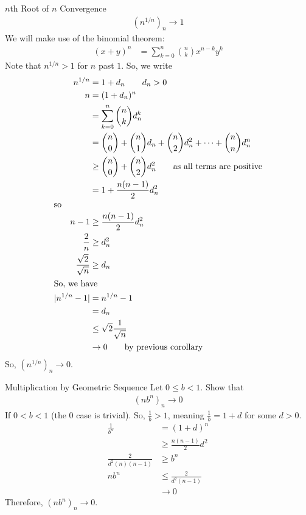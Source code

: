 \documentclass[10pt]{extarticle}
\begin{document}
    \begin{problem}{$n$th Root of $n$ Convergence}
      \begin{align*}
        \left(n^{1/n}\right)_n \rightarrow 1
      \end{align*}
      \tcblower
      We will make use of the binomial theorem:
      \begin{align*}
        (x+y)^n &= \sum_{k=0}^{n} {n\choose k}x^{n-k}y^{k}
      \end{align*}
      Note that $n^{1/n} > 1$ for $n$ past $1$. So, we write
      \begin{align*}
        n^{1/n} &= 1 + d_n \tag*{$d_n > 0$}\\
        n &= (1+d_n)^{n}\\
          &= \sum_{k=0}^{n} {n\choose k}d_n^{k}\\
          &= {n\choose 0} + {n\choose 1}d_n + {n\choose 2}d_n^2 + \cdots + {n\choose n}d_n^n\\
          &\geq {n\choose 0} + {n\choose 2}d_n^2 \tag*{as all terms are positive}\\
          &= 1 + \frac{n(n-1)}{2}d_n^2\\
          \shortintertext{so}
        n-1 &\geq \frac{n(n-1)}{2}d_n^2\\
        \frac{2}{n} &\geq d_n^2\\
        \frac{\sqrt{2}}{\sqrt{n}} &\geq d_n\\
        \shortintertext{So, we have}
        |n^{1/n} - 1| &= n^{1/n} - 1\\
                      &= d_n\\
                      &\leq \sqrt{2} \frac{1}{\sqrt{n}}\\
                      &\rightarrow 0 \tag*{by previous corollary}
      \end{align*}
      So, $\left(n^{1/n}\right)_n \rightarrow 0$.
    \end{problem}
    \begin{problem}{Multiplication by Geometric Sequence}
      Let $0 \leq b < 1$. Show that
      \begin{align*}
        \left(nb^n\right)_n \rightarrow 0
      \end{align*}
      \tcblower
      If $0 < b < 1$ (the $0$ case is trivial). So, $\frac{1}{b} > 1$, meaning $\frac{1}{b} = 1 + d$ for some $d > 0$.
      \begin{align*}
        \frac{1}{b^n} &= (1 + d)^n\\
                      &\geq \frac{n(n-1)}{2}d^2\\
        \frac{2}{d^2(n)(n-1)} &\geq b^n\\
        nb^n &\leq \frac{2}{d^2(n-1)}\\
             &\rightarrow 0 \tag*{by previous corollary}
      \end{align*}
      Therefore, $(nb^n)_n \rightarrow 0$.
    \end{problem}
\end{document}
